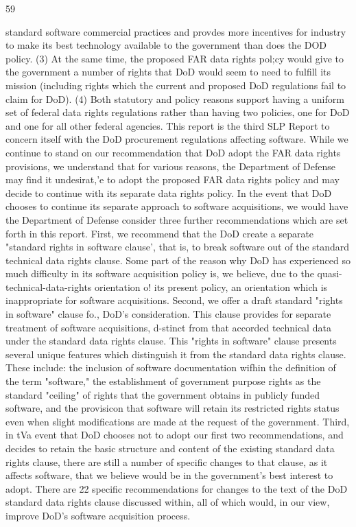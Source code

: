 \documentclass[12pt]{article}
\begin{document}
59

standard software commercial practices and provdes more incentives for industry to make its best
technology available to the government than does the DOD policy. (3) At the same time, the proposed FAR data rights pol;cy would give to the government a number of rights that DoD would seem
to need to fulfill its mission (including rights which the current and proposed DoD regulations fail to
claim for DoD). (4) Both statutory and policy reasons support having a uniform set of federal data
rights regulations rather than having two policies, one for DoD and one for all other federal agencies.
This report is the third SLP Report to concern itself with the DoD procurement regulations affecting
software. While we continue to stand on our recommendation that DoD adopt the FAR data rights
provisions, we understand that for various reasons, the Department of Defense may find it undesirat,'e to adopt the proposed FAR data rights policy and may decide to continue with its separate data
rights policy.
In the event that DoD chooses to continue its separate approach to software acquisitions, we would
have the Department of Defense consider three further recommendations which are set forth in this
report. First, we recommend that the DoD create a separate "standard rights in software clause', that
is, to break software out of the standard technical data rights clause. Some part of the reason why
DoD has experienced so much difficulty in its software acquisition policy is, we believe, due to the
quasi-technical-data-rights orientation o! its present policy, an orientation which is inappropriate for
software acquisitions.
Second, we offer a draft standard "rights in software" clause fo., DoD's consideration. This clause
provides for separate treatment of software acquisitions, d-stinct from that accorded technical data
under the standard data rights clause. This "rights in software" clause presents several unique features which distinguish it from the standard data rights clause. These include: the inclusion of
software documentation wifhin the definition of the term "software," the establishment of government
purpose rights as the standard "ceiling" of rights that the government obtains in publicly funded software, and the provisicon that software will retain its restricted rights status even when slight modifications are made at the request of the government.
Third, in tVa event that DoD chooses not to adopt our first two recommendations, and decides to
retain the basic structure and content of the existing standard data rights clause, there are still a
number of specific changes to that clause, as it affects software, that we believe would be in the
government's best interest to adopt. There are 22 specific recommendations for changes to the text
of the DoD standard data rights clause discussed within, all of which would, in our view, improve
DoD's software acquisition process.
\end{document}
